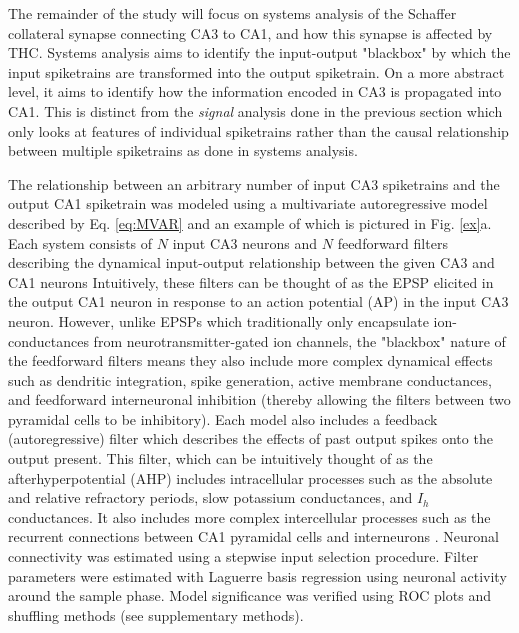 \documentclass[11pt,a4paper,final]{article}
\begin{document}
The remainder of the study will focus on systems analysis of the Schaffer collateral synapse  connecting CA3 to CA1, and how this synapse is affected by THC.
Systems analysis aims to identify the input-output "blackbox" by which the input spiketrains are transformed into the output spiketrain.
On a more abstract level, it aims to identify how the information encoded in CA3 is propagated into CA1.
This is distinct from the \textit{signal} analysis done in the previous section which only looks at features of individual spiketrains rather than the causal relationship between multiple spiketrains as done in systems analysis.

The relationship between an arbitrary number of input CA3 spiketrains and the output CA1 spiketrain was modeled using a multivariate autoregressive model described by Eq. \ref{eq:MVAR} and an example of which is pictured in Fig. \ref{ex}a.
Each system consists of $N$ input CA3 neurons and $N$ feedforward filters describing the dynamical input-output relationship between the given CA3 and CA1 neurons %
Intuitively, these filters can be thought of as the EPSP elicited in the output CA1 neuron in response to an action potential (AP) in the input CA3 neuron.
However, unlike EPSPs which traditionally only encapsulate ion-conductances from neurotransmitter-gated ion channels, the "blackbox" nature of the feedforward filters means they also include more complex dynamical effects such as dendritic integration, spike generation, active membrane conductances, and feedforward interneuronal inhibition (thereby allowing the filters between two pyramidal cells to be inhibitory).
Each model also includes a feedback (autoregressive) filter which describes the effects of past output spikes onto the output present.
This filter, which can be intuitively thought of as the afterhyperpotential (AHP) \citep{spruston07} includes intracellular processes such as the absolute and relative refractory periods, slow potassium conductances, and $I_h$ conductances.
It also includes more complex intercellular processes such as the recurrent connections between CA1 pyramidal cells and interneurons \citep{klausberger08}.
Neuronal connectivity was estimated using a stepwise input selection procedure.
Filter parameters were estimated with Laguerre basis regression using neuronal activity around the sample phase.
Model significance was verified using ROC plots and shuffling methods (see supplementary methods).
\end{document}
